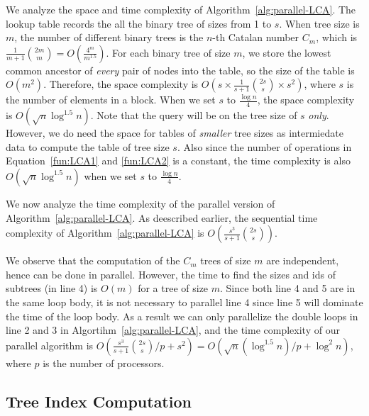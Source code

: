 We analyze the space and time complexity of
Algorithm~\ref{alg:parallel-LCA}.  The lookup table records the all
the binary tree of sizes from 1 to $s$.  When tree size is $m$, the
number of different binary trees is the $n$-th Catalan number $C_m$,
which is $\frac{1}{m+1}\binom{2m}{m} = O(\frac{4^m}{m^{1.5}})$.  For
each binary tree of size $m$, we store the lowest common ancestor of
{\em every} pair of nodes into the table, so the size of the table is
$O(m^2)$.  Therefore, the space complexity is $O(s \times
\frac{1}{s+1}\binom{2s}{s} \times s^2)$, where $s$ is the number of
elements in a block.  When we set $s$ to $\frac{\log n}{4}$, the space
complexity is $O(\sqrt{n} \log ^{1.5} n)$.  Note that the query will
be on the tree size of $s$ {\em only}.  However, we do need the space
for tables of {\em smaller} tree sizes as intermiedate data to compute
the table of tree size $s$.  Also since the number of operations in
Equation~\ref{fun:LCA1} and \ref{fun:LCA2} is a constant, the time
complexity is also $O(\sqrt{n} \log ^{1.5} n)$ when we set $s$ to
$\frac{\log n}{4}$.

We now analyze the time complexity of the parallel version of
Algorithm~\ref{alg:parallel-LCA}.  As deescribed earlier, the
sequential time complexity of Algorithm~\ref{alg:parallel-LCA} is
$O(\frac{s^3}{s+1} \binom{2s}{s})$. 

We observe that the computation of the $C_m$ trees of size $m$ are
independent, hence can be done in parallel.  However, the time to find
the sizes and ids of subtrees (in line 4) is $O(m)$ for a tree of size
$m$.  Since both line 4 and 5 are in the same loop body, it is not
necessary to parallel line 4 since line 5 will dominate the time of
the loop body.  As a result we can only parallelize the double loops
in line 2 and 3 in Algortihm~\ref{alg:parallel-LCA}, and the time
complexity of our parallel algorithm is $O(\frac{s^3}{s+1}
\binom{2s}{s} / p + s^2) = O(\sqrt{n} (\log ^{1.5} n) / p + \log^2 n
)$, where $p$ is the number of processors.







\subsection{Tree Index Computation}

